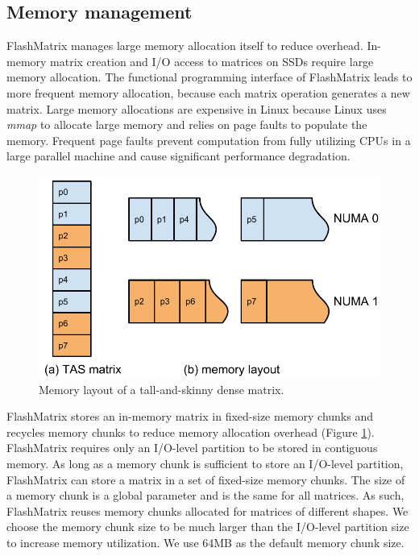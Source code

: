 \subsection{Memory management} \label{sec:mem}
FlashMatrix manages large memory allocation itself to reduce overhead.
In-memory matrix creation and I/O access to matrices on SSDs require large memory
allocation. The functional programming interface of FlashMatrix leads to more
frequent memory allocation, because each matrix operation generates a new matrix. 
Large memory allocations are expensive in Linux because Linux uses \textit{mmap}
to allocate large memory and relies on page faults to populate the memory.
Frequent page faults prevent computation from fully utilizing CPUs in a large
parallel machine and cause significant performance degradation.

\begin{figure}
	\centering
	\includegraphics[scale=0.5]{FlashMatrix_figs/matrix_mem.pdf}
	\caption{Memory layout of a tall-and-skinny dense matrix.}
	\label{fig:mat_mem}
\end{figure}

FlashMatrix stores an in-memory matrix in fixed-size memory chunks and
recycles memory chunks to reduce memory allocation overhead (Figure
\ref{fig:mat_mem}). FlashMatrix requires only an I/O-level partition to
be stored in contiguous memory. As long as a memory chunk is sufficient
to store an I/O-level partition, FlashMatrix can store a matrix in a set
of fixed-size memory chunks. The size of a memory chunk is a global parameter
and is the same for all matrices. As such, FlashMatrix reuses memory chunks
allocated for matrices of different shapes. 
We choose the memory chunk
size to be much larger than the I/O-level partition size to increase
memory utilization. We use 64MB as the default memory chunk size.

